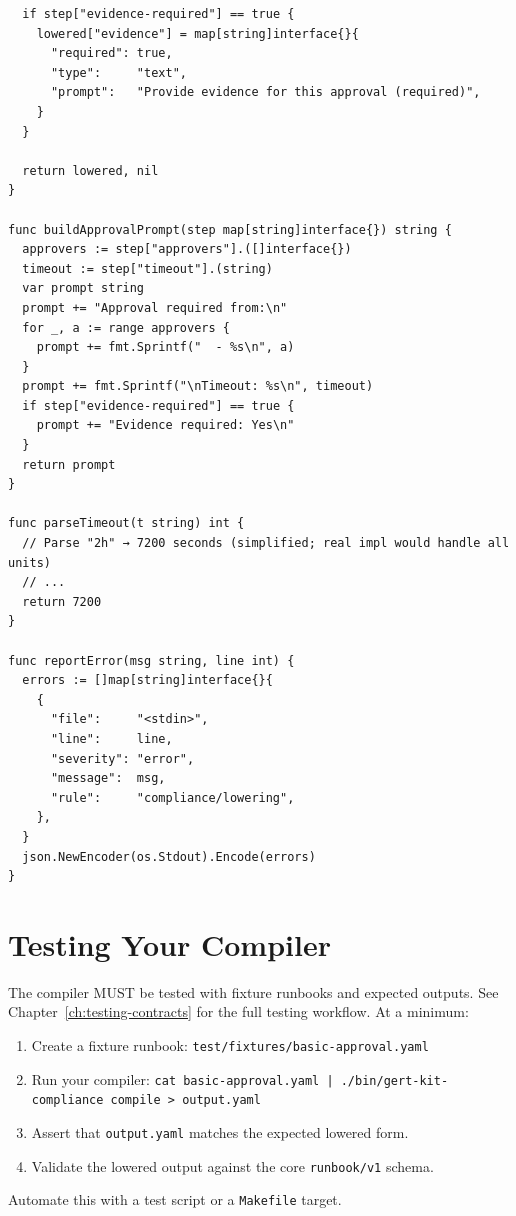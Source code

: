 \begin{verbatim}
  if step["evidence-required"] == true {
    lowered["evidence"] = map[string]interface{}{
      "required": true,
      "type":     "text",
      "prompt":   "Provide evidence for this approval (required)",
    }
  }

  return lowered, nil
}

func buildApprovalPrompt(step map[string]interface{}) string {
  approvers := step["approvers"].([]interface{})
  timeout := step["timeout"].(string)
  var prompt string
  prompt += "Approval required from:\n"
  for _, a := range approvers {
    prompt += fmt.Sprintf("  - %s\n", a)
  }
  prompt += fmt.Sprintf("\nTimeout: %s\n", timeout)
  if step["evidence-required"] == true {
    prompt += "Evidence required: Yes\n"
  }
  return prompt
}

func parseTimeout(t string) int {
  // Parse "2h" → 7200 seconds (simplified; real impl would handle all units)
  // ...
  return 7200
}

func reportError(msg string, line int) {
  errors := []map[string]interface{}{
    {
      "file":     "<stdin>",
      "line":     line,
      "severity": "error",
      "message":  msg,
      "rule":     "compliance/lowering",
    },
  }
  json.NewEncoder(os.Stdout).Encode(errors)
}
\end{verbatim}

\section{Testing Your Compiler}
\label{sec:testing-compiler}

The compiler MUST be tested with fixture runbooks and expected outputs. See
Chapter~\ref{ch:testing-contracts} for the full testing workflow. At a minimum:

\begin{enumerate}
  \item Create a fixture runbook: \texttt{test/fixtures/basic-approval.yaml}
  \item Run your compiler: \texttt{cat basic-approval.yaml | ./bin/gert-kit-compliance compile > output.yaml}
  \item Assert that \texttt{output.yaml} matches the expected lowered form.
  \item Validate the lowered output against the core \texttt{runbook/v1} schema.
\end{enumerate}

Automate this with a test script or a \texttt{Makefile} target.

